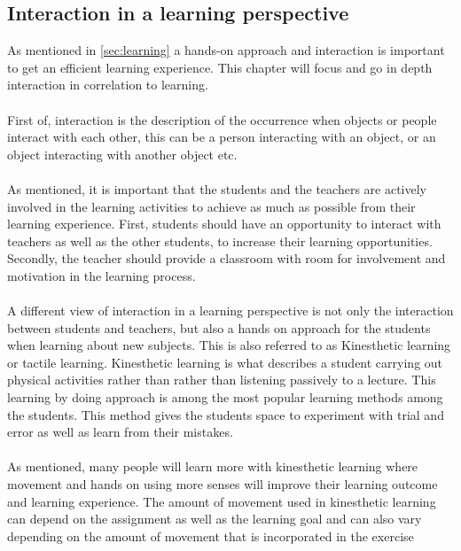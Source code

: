 \subsection{Interaction in a learning perspective}\label{sec:interaction} 
As mentioned in \autoref{sec:learning} a hands-on approach and interaction is important to get an efficient learning experience. This chapter will focus and go in depth  interaction in correlation to learning.\\
\\
First of, interaction is the description of the occurrence when objects or people interact with each other, this can be a person interacting with an object, or an object interacting with another object etc.\\
\\
As mentioned, it is important that the students and the teachers are actively involved in the learning activities to achieve as much as possible from their learning experience. First, students should have an opportunity to interact with teachers as well as the other students, to increase their learning opportunities. Secondly, the teacher should provide a classroom with room for involvement and motivation in the learning process\cite{interactionlearning}.\\
\\
A different view of interaction in a learning perspective is not only the interaction between students and teachers, but also a hands on approach for the students when learning about new subjects. This is also referred to as Kinesthetic learning or tactile learning. Kinesthetic learning is what describes a student carrying out physical activities rather than rather than  listening passively to a lecture. This learning by doing approach is among the most popular learning methods among the students. This method gives the students space to experiment with trial and error as well as learn from their mistakes.\cite{kinest} \\
\\
As mentioned, many people will learn more with kinesthetic learning where movement and hands on using more senses will improve their learning outcome and learning experience. The amount of movement used in kinesthetic learning can depend on the assignment as well as the learning goal and can also vary depending on the amount of movement that is incorporated in the exercise\\

